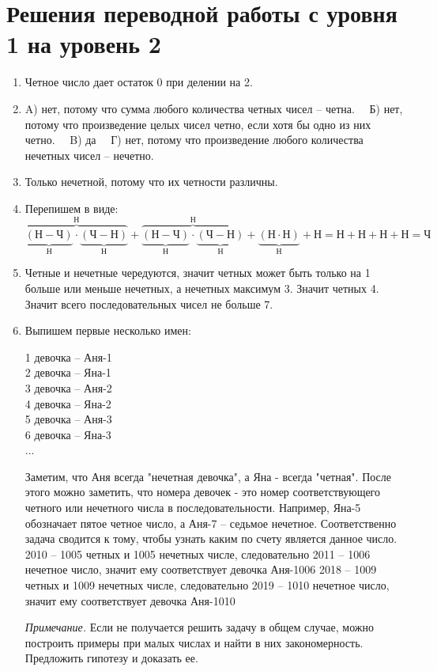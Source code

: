 \section{Решения переводной работы с уровня 1 на уровень 2}
\begin{enumerate}
	\item Четное число дает остаток 0 при делении на 2.
	\item A) нет, потому что сумма любого количества четных чисел -- четна.~~ Б) нет, потому что произведение целых чисел четно, если хотя бы одно из них четно.~~ B) да ~~Г) нет, потому что произведение любого количества нечетных чисел -- нечетно.
	\item Только нечетной, потому что их четности различны.
	\item Перепишем в виде: $\overbrace{\underbrace{(Н-Ч)}_{Н}\cdot\underbrace{(Ч-Н)}_{Н}}^{Н}+\overbrace{\underbrace{(Н-Ч)}_{Н}\cdot\underbrace{(Ч-Н)}_{Н}}^{Н}+\underbrace{(Н\cdot Н)}_{Н}+Н=Н+Н+Н+Н=Ч$
	\item Четные и нечетные чередуются, значит четных может быть только на 1 больше или меньше нечетных, а нечетных максимум 3. Значит четных 4. Значит всего последовательных чисел не больше 7.
	\newpage
	\item Выпишем первые несколько имен:
	\begin{center}
		1 девочка -- Аня-1\\
	2 девочка -- Яна-1\\
	3 девочка -- Аня-2\\
	4 девочка -- Яна-2\\
	5 девочка -- Аня-3\\
	6 девочка -- Яна-3\\
	...\\
	\end{center}
Заметим, что Аня всегда "нечетная девочка", а Яна - всегда "четная". После этого можно заметить, что номера девочек - это номер соответствующего четного или нечетного числа в последовательности. Например, Яна-5 обозначает пятое четное число, а Аня-7 -- седьмое нечетное.
	Соответственно задача сводится к тому, чтобы узнать каким по счету является данное число.
	2010 -- 1005 четных и 1005 нечетных числе, следовательно 2011 -- 1006 нечетное число, значит ему соответствует девочка Аня-1006
	2018 -- 1009 четных и 1009 нечетных числе, следовательно 2019 -- 1010 нечетное число, значит ему соответствует девочка Аня-1010
	
	\textit{Примечание.} Если не получается решить задачу в общем случае, можно построить примеры при малых числах и найти в них закономерность. Предложить гипотезу и доказать ее.
\end{enumerate}